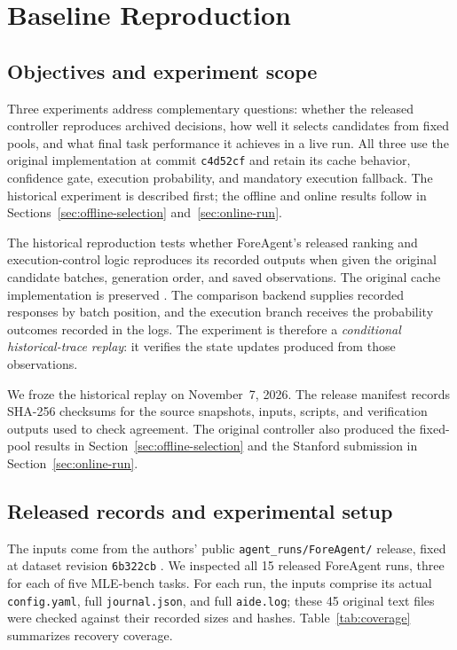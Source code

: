 \section{Baseline Reproduction}
\label{sec:reproduction}

\subsection{Objectives and experiment scope}

Three experiments address complementary questions: whether the released controller reproduces archived decisions, how well it selects candidates from fixed pools, and what final task performance it achieves in a live run. All three use the original implementation at commit \texttt{c4d52cf} and retain its cache behavior, confidence gate, execution probability, and mandatory execution fallback. The historical experiment is described first; the offline and online results follow in Sections~\ref{sec:offline-selection} and~\ref{sec:online-run}.

The historical reproduction tests whether ForeAgent's released ranking and execution-control logic reproduces its recorded outputs when given the original candidate batches, generation order, and saved observations. The original cache implementation is preserved \citep{foreagentcode}. The comparison backend supplies recorded responses by batch position, and the execution branch receives the probability outcomes recorded in the logs. The experiment is therefore a \emph{conditional historical-trace replay}: it verifies the state updates produced from those observations.

We froze the historical replay on November~7, 2026. The release manifest records SHA-256 checksums for the source snapshots, inputs, scripts, and verification outputs used to check agreement. The original controller also produced the fixed-pool results in Section~\ref{sec:offline-selection} and the Stanford submission in Section~\ref{sec:online-run}.

\subsection{Released records and experimental setup}

The inputs come from the authors' public \texttt{agent\_runs/ForeAgent/} release, fixed at dataset revision \texttt{6b322cb} \citep{foreagentdata}. We inspected all 15 released ForeAgent runs, three for each of five MLE-bench tasks. For each run, the inputs comprise its actual \texttt{config.yaml}, full \texttt{journal.json}, and full \texttt{aide.log}; these 45 original text files were checked against their recorded sizes and hashes. Table~\ref{tab:coverage} summarizes recovery coverage.

